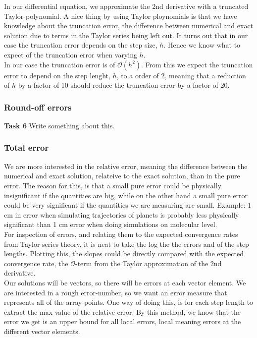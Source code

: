 \documentclass{article}
\begin{document}
In our differential equation, we approximate the 2nd derivative with a truncated Taylor-polynomial. A nice thing by using Taylor ploynomials is that we have knowledge about the truncation error, the difference between numerical and exact solution due to terms in the Taylor series being left out. It turns out that in our case the truncation error depends on the step size, $h$. Hence we know what to expect of the truncation error when varying $h$. \\

In our case the truncation error is of $\mathcal{O}(h^2)$. From this we expect the truncation error to depend on the step lenght, $h$, to a order of 2, meaning that a reduction of $h$ by a factor of 10 should reduce the truncation error by a factor of 20.

\subsubsection{Round-off errors}
\textbf{Task 6} Write something about this.

\subsubsection{Total error}
We are more interested in the relative error, meaning the difference between the numerical and exact solution, relateive to the exact solution, than in the pure error. The reason for this, is that a small pure error could be physically insignificant if the quantities are big, while on the other hand a small pure error could be very significant if the quantities we are measuring are small. Example: 1 cm in error when simulating trajectories of planets is probably less physically significant than 1 cm error when doing simulations on molecular level.\\

For inspection of errors, and relating them to the expected convergence rates from Taylor series theory, it is neat to take the log the the errors and of the step lengths. Plotting this, the slopes could be directly compared with the expected convergence rate, the $\mathcal{O}$-term from the Taylor approximation of the 2nd derivative.\\

Our solutions will be vectors, so there will be errors at each vector element. We are interested in a rough error-number, so we want an error measure that represents all of the array-points. One way of doing this, is for each step length to extract the max value of the relative error. By this method, we know that the error we get is an upper bound for all local errors, local meaning errors at the different vector elements.\\
\end{document}
